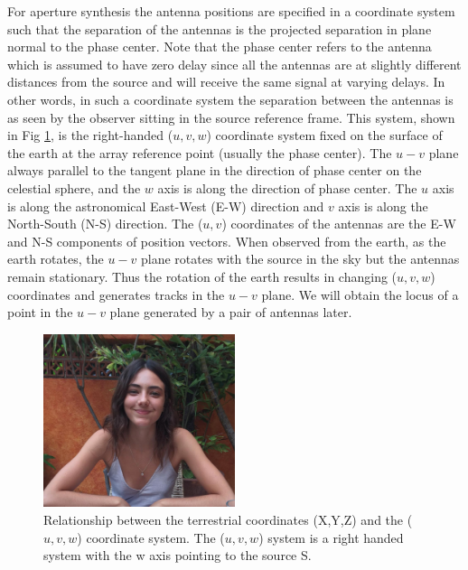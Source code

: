 For aperture synthesis the antenna positions are specified in a coordinate system such that the separation of the antennas is the projected separation in plane normal to the phase center.  Note that the phase center refers to the antenna which is assumed to have zero delay since all the antennas are at slightly different distances from the source and will receive the same signal at varying delays. In other words, in such a coordinate system the separation between the antennas is as seen by the observer sitting in the source reference frame. This system, shown in Fig \ref{fig:ap_synth3}, is the right-handed ($u,v,w$) coordinate system fixed on the surface of the earth at the array reference point (usually the phase center). The $u-v$ plane always parallel to the tangent plane in the direction of phase center on the celestial sphere, and the $w$ axis is along the direction of phase center. The $u$ axis is along the astronomical East-West (E-W) direction and $v$ axis is along the North-South (N-S) direction. The ($u,v$) coordinates of the antennas are the E-W and N-S components of position vectors. When observed from the earth, as the earth rotates, the $u-v$ plane rotates with the source in the sky but the antennas remain stationary. Thus the rotation of the earth results in changing ($u,v,w$) coordinates and generates tracks in the  $u-v$ plane. We will obtain the locus of a point in the $u-v$ plane generated by a pair of antennas later. 
\begin{figure}[!htb]
	\centering \vspace{-0.1in}
	\includegraphics[width=0.5\textwidth]{images/aperture_synth3.png}	
	\caption[Aperture synthesis coordinate system]{\small  Relationship between the terrestrial coordinates (X,Y,Z) and the ($u,v,w$) coordinate system. The ($u,v,w$) system is a right handed system with the w axis pointing to the source S.  \footnotemark}
	\label{fig:ap_synth3}
\end{figure}


